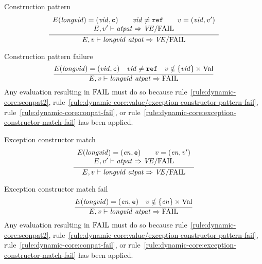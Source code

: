 \begin{inference-rule}{Construction pattern}
\begin{equation}\label{rule:dynamic-core:conpat-rule1}
\vcenter{\infer{\E,\V\ts\vidpat\ra \VE/\fail}
  {\begin{array}{c}
      \E(\longvid) = (\vid,\isc)\qquad\vid\neq\REF\qquad
      \V=(\vid,\V')\\
      \E,\V'\ts\atpat\ra\VE/\fail
\end{array}}}
\end{equation}
\end{inference-rule}

\begin{inference-rule}{Construction pattern failure}
\begin{equation}\label{rule:dynamic-core:conpat-fail}
\vcenter{\infer{\E,\V\ts\vidpat\ra \FAIL}
  {\E(\longvid) = (\vid,\isc)
    & \vid\neq\REF
    & \V\notin\{\vid\}\times\Val}}
\end{equation}
Any evaluation resulting in ${\rm FAIL}$ must do so because 
rule~\ref{rule:dynamic-core:sconpat2},
rule~\ref{rule:dynamic-core:value/exception-constructor-pattern-fail},
rule~\ref{rule:dynamic-core:conpat-fail},
or rule~\ref{rule:dynamic-core:exception-constructor-match-fail}
has been applied.
\end{inference-rule}

\begin{inference-rule}{Exception constructor match}
\begin{equation}\label{rule:dynamic-core:exception-constructor-match}
\vcenter{\infer{\E,\V\ts\vidpat\ra\VE/\FAIL}
  {\begin{array}{c}
      \E(\longvid)=(\e,\ise)\qquad\V=(\e,\V')\\
      \E,\V'\ts\atpat\ra\VE/\FAIL
      \end{array}
}}
\end{equation}
\end{inference-rule}

\begin{inference-rule}{Exception constructor match fail}
\begin{equation}\label{rule:dynamic-core:exception-constructor-match-fail}
\vcenter{\infer{\E,\V\ts\vidpat\ra\FAIL}
  {\E(\longvid)=(\e,\ise)
    & \V\notin\{\e\}\times\Val}}
\end{equation}
Any evaluation resulting in ${\rm FAIL}$ must do so because 
rule~\ref{rule:dynamic-core:sconpat2},
rule~\ref{rule:dynamic-core:value/exception-constructor-pattern-fail},
rule~\ref{rule:dynamic-core:conpat-fail},
or rule~\ref{rule:dynamic-core:exception-constructor-match-fail}
has been applied.
\end{inference-rule}

